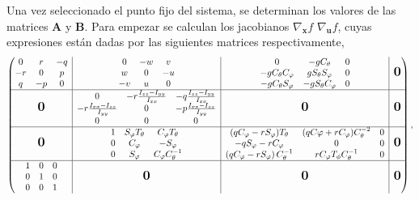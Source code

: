 Una vez seleccionado el punto fijo del sistema, se determinan los valores de las matrices $\mathbf{A}$ y $\mathbf{B}$. Para empezar se calculan los jacobianos $\nabla_{\mathbf{x}}f$ $\nabla_{\mathbf{u}}f$, cuyas expresiones están dadas por las siguientes matrices respectivamente,
\begin{align}\label{eq:jac_fx}
\begin{pmatrix}
  \begin{matrix}
  0 & r & -q \\
  -r & 0 & p \\
  q & -p & 0
  \end{matrix}
  & \rvline & 
  \begin{matrix}
    0 & -w & v \\
    w & 0 & -u \\
    -v& u & 0
  \end{matrix} & 
  \rvline & 
  \begin{matrix}
  0 & -gC_{\theta} & 0 \\
  -gC_{\theta}C_{\varphi} & gS_{\theta}S_{\varphi} & 0 \\
  -gC_{\theta}S_{\varphi} & -gS_{\theta}C_{\varphi} & 0
  \end{matrix} 
  & \rvline & \bigzero
  \\
\hline
  \bigzero & \rvline & 
  \begin{matrix}
  0 & -r \frac{I_{zz}-I_{yy}}{I_{xx}} & -q \frac{I_{zz}-I_{yy}}{I_{xx}} \\
  -r \frac{I_{xx}-I_{zz}}{I_{yy}} & 0 & -p \frac{I_{xx}-I_{zz}}{I_{yy}} \\
  0 & 0 & 0
  \end{matrix}
  & 
  \rvline & 
  \bigzero & \rvline & \bigzero \\
  \hline 
  \bigzero & \rvline & 
  \begin{matrix}
  1 & S_{\varphi} T_{\theta} & C_{\varphi} T_{\theta} \\
  0 & C_{\varphi} & -S_{\varphi} \\ 
  0 & S_{\varphi} & C_{\varphi}C_{\theta}^{-1} \\
  \end{matrix}
  & \rvline & 
  \begin{matrix}
     (qC_{\varphi}-rS_{\varphi})T_{\theta} & (qC{\varphi}+rC_{\varphi})C_{\theta}^{-2} & 0 \\
      -qS_{\varphi}- rC_{\varphi} & 0 & 0 \\
      \left(qC_{\varphi}- rS_{\varphi}\right)C_{\theta}^{-1} & rC_{\varphi}T_{\phi}C^{-1}_{\theta} & 0
  \end{matrix} 
  & \rvline & \bigzero 
  \\ 
  \hline 
  \begin{matrix}
  1 & 0 & 0 \\
  0 & 1 & 0 \\
  0 & 0 & 1
  \end{matrix}
  & \rvline & \bigzero & \rvline & \bigzero & \rvline & \bigzero \\ 
\end{pmatrix},
\end{align}
